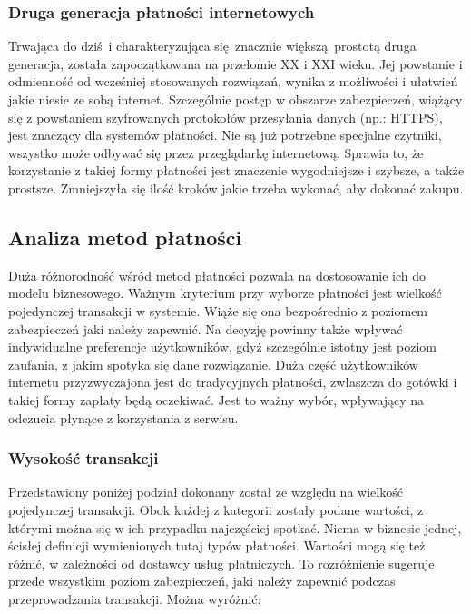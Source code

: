 \subsubsection*{Druga generacja płatności internetowych}

Trwająca do dziś i charakteryzująca się znacznie większą prostotą druga 
generacja, została zapoczątkowana na przełomie XX i XXI wieku. Jej powstanie i 
odmienność od wcześniej stosowanych rozwiązań, wynika z możliwości i ułatwień 
jakie niesie ze sobą internet. Szczególnie postęp w
obszarze zabezpieczeń, wiążący się z powstaniem szyfrowanych protokołów 
przesyłania danych (np.: HTTPS), jest znaczący dla systemów płatności. Nie są 
już potrzebne specjalne czytniki, wszystko może odbywać się przez przeglądarkę 
internetową. Sprawia to, że korzystanie z takiej formy płatności jest znaczenie 
wygodniejsze i szybsze, a także prostsze. Zmniejszyła się ilość kroków
jakie trzeba wykonać, aby dokonać zakupu.

\subsection{Analiza metod płatności}

Duża różnorodność wśród metod płatności pozwala na dostosowanie ich do modelu biznesowego. Ważnym kryterium przy wyborze 
płatności jest wielkość pojedynczej transakcji w systemie. Wiąże się ona 
bezpośrednio z poziomem zabezpieczeń jaki należy zapewnić. Na decyzję powinny 
także wpływać indywidualne preferencje użytkowników, gdyż szczególnie istotny jest 
poziom zaufania, z jakim spotyka się dane rozwiązanie. Duża część użytkowników 
internetu przyzwyczajona jest do tradycyjnych płatności, zwłaszcza do gotówki 
i takiej formy zapłaty będą oczekiwać. Jest to ważny wybór, wpływający na 
odczucia płynące z korzystania z serwisu.

\subsubsection*{Wysokość transakcji}

Przedstawiony poniżej podział dokonany został ze względu na wielkość 
pojedynczej transakcji. Obok każdej z kategorii zostały podane wartości, z 
którymi można się w ich przypadku najczęściej spotkać. Niema w biznesie jednej, 
ścisłej definicji wymienionych tutaj typów płatności. Wartości mogą się też 
różnić, w zależności od dostawcy usług płatniczych. To rozróżnienie sugeruje 
przede wszystkim poziom zabezpieczeń, jaki należy zapewnić podczas 
przeprowadzania transakcji. Można wyróżnić:

